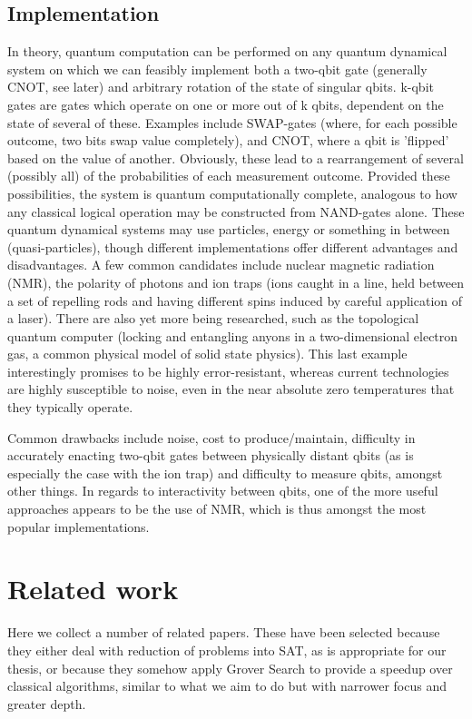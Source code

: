 \documentclass[msc,lith,english]{liuthesis}
\begin{document}
\subsection{Implementation}
In theory, quantum computation can be performed on any quantum dynamical system on which we can feasibly implement both a two-qbit gate (generally CNOT, see later) and arbitrary rotation of the state of singular qbits. k-qbit gates are gates which operate on one or more out of k qbits, dependent on the state of several of these. Examples include SWAP-gates (where, for each possible outcome, two bits swap value completely), and CNOT, where a qbit is 'flipped' based on the value of another. Obviously, these lead to a rearrangement of several (possibly all) of the probabilities of each measurement outcome\cite{QCQI}. Provided these possibilities, the system is quantum computationally complete, analogous to how any classical logical operation may be constructed from NAND-gates alone. These quantum dynamical systems may use particles, energy or something in between (quasi-particles), though different implementations offer different advantages and disadvantages. A few common candidates include nuclear magnetic radiation (NMR), the polarity of photons and ion traps (ions caught in a line, held between a set of repelling rods and having different spins induced by careful application of a laser)\cite{QCQI}\cite{EIQC}. There are also yet more being researched, such as the topological quantum computer (locking and entangling anyons in a two-dimensional electron gas, a common physical model of solid state physics). This last example interestingly promises to be highly error-resistant, whereas current technologies are highly susceptible to noise, even in the near absolute zero temperatures that they typically operate\cite{EIQC}. 

Common drawbacks include noise, cost to produce/maintain, difficulty in accurately enacting two-qbit gates between physically distant qbits (as is especially the case with the ion trap) and difficulty to measure qbits, amongst other things. In regards to interactivity between qbits, one of the more useful approaches appears to be the use of NMR, which is thus amongst the most popular implementations\cite{QCQI}.

\section{Related work}
Here we collect a number of related papers. These have been selected because they either deal with reduction of problems into SAT, as is appropriate for our thesis, or because they somehow apply Grover Search to provide a speedup over classical algorithms, similar to what we aim to do but with narrower focus and greater depth.
\end{document}
